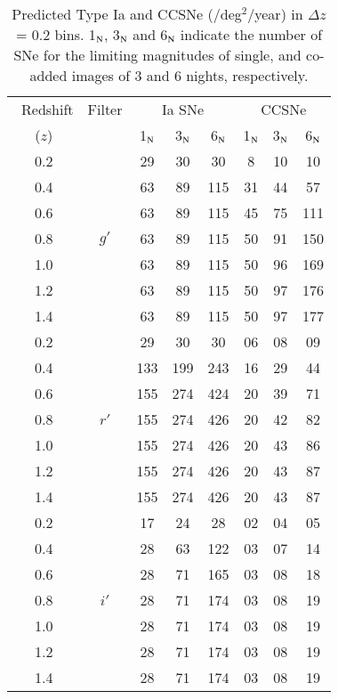 \documentclass[useAMS,usenatbib]{mnras}
\begin{document}
\begin{table}
\centering
\small
\caption{Predicted Type Ia and CCSNe (/deg$^{2}$/year) in $\Delta$$z$ = 0.2 bins.
1$_{\rm N}$, 3$_{\rm N}$ and 6$_{\rm N}$ indicate the number of SNe for the limiting magnitudes of
single, and co-added images of 3 and 6 nights, respectively.}
\label{ILMT_sn_det_z}
\begin{tabular}{cccccccc}
\hline\
Redshift   &Filter   & \multicolumn{3}{c}{Ia SNe}  & \multicolumn{3}{c}{CCSNe}\\
($z$)      &         & 1$_{\rm N}$ & 3$_{\rm N}$ & 6$_{\rm N}$ & 1$_{\rm N}$ & 3$_{\rm N}$ & 6$_{\rm N}$ \\ \hline
%
0.2   &        & 29 & 30   & 30    & 8  & 10 & 10   \\ 
0.4   &        & 63 & 89   & 115   & 31 & 44 & 57   \\
0.6   &        & 63 & 89   & 115   & 45 & 75 & 111  \\
0.8   & $g'$   & 63 & 89   & 115   & 50 & 91 & 150  \\
1.0   &        & 63 & 89   & 115   & 50 & 96 & 169  \\
1.2   &        & 63 & 89   & 115   & 50 & 97 & 176  \\
1.4   &        & 63 & 89   & 115   & 50 & 97 & 177  \\
\hline
0.2   &        & 29  & 30  & 30    & 06 & 08 & 09   \\  
0.4   &        & 133 & 199 & 243   & 16 & 29 & 44   \\
0.6   &        & 155 & 274 & 424   & 20 & 39 & 71   \\
0.8   & $r'$   & 155 & 274 & 426   & 20 & 42 & 82   \\
1.0   &        & 155 & 274 & 426   & 20 & 43 & 86   \\
1.2   &        & 155 & 274 & 426   & 20 & 43 & 87   \\
1.4   &        & 155 & 274 & 426   & 20 & 43 & 87   \\
\hline
0.2   &        & 17  & 24  & 28    & 02 & 04 & 05   \\ 
0.4   &        & 28  & 63  & 122   & 03 & 07 & 14   \\
0.6   &        & 28  & 71  & 165   & 03 & 08 & 18   \\
0.8   & $i'$   & 28  & 71  & 174   & 03 & 08 & 19   \\
1.0   &        & 28  & 71  & 174   & 03 & 08 & 19   \\
1.2   &        & 28  & 71  & 174   & 03 & 08 & 19   \\
1.4   &        & 28  & 71  & 174   & 03 & 08 & 19   \\
\hline
\end{tabular}
\end{table}

\label{lastpage}
\end{document}

